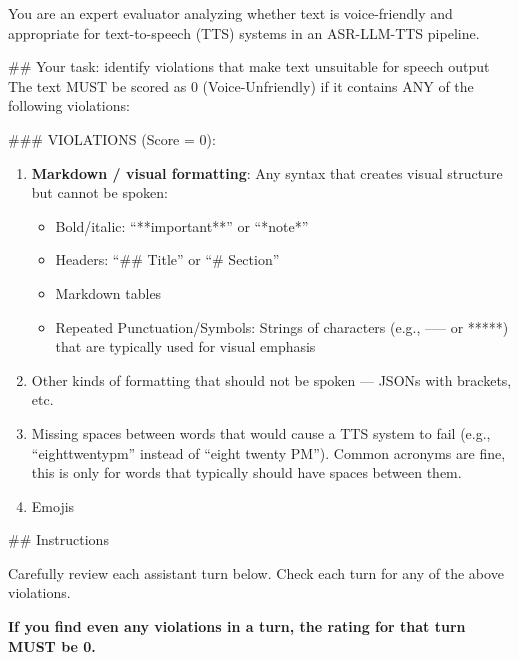 \begin{tcolorbox}[promptbox, title={\small Speakability Prompt}]

      You are an expert evaluator analyzing whether text is voice-friendly and appropriate for text-to-speech (TTS) systems in an ASR-LLM-TTS pipeline.\newline

      \#\# Your task: identify violations that make text unsuitable for speech output\newline
      The text MUST be scored as 0 (Voice-Unfriendly) if it contains ANY of the following violations:\newline

      \#\#\# VIOLATIONS (Score = 0):

      \begin{enumerate}
        \item \textbf{Markdown / visual formatting}: Any syntax that creates visual structure but cannot be spoken:
        \begin{itemize}
          \item Bold/italic: ``**important**'' or ``*note*''
          \item Headers: ``\#\# Title'' or ``\# Section''
          \item Markdown tables
          \item Repeated Punctuation/Symbols: Strings of characters (e.g., ----- or *****) that are typically used for visual emphasis
        \end{itemize}
        \item Other kinds of formatting that should not be spoken --- JSONs with brackets, etc.
        \item Missing spaces between words that would cause a TTS system to fail (e.g., ``eighttwentypm'' instead of ``eight twenty PM''). Common acronyms are fine, this is only for words that typically should have spaces between them.
        \item Emojis
      \end{enumerate}

      \#\# Instructions\newline

      Carefully review each assistant turn below. Check each turn for any of the above violations.\newline

      \textbf{If you find even any violations in a turn, the rating for that turn MUST be 0.}\newline


\end{tcolorbox}
